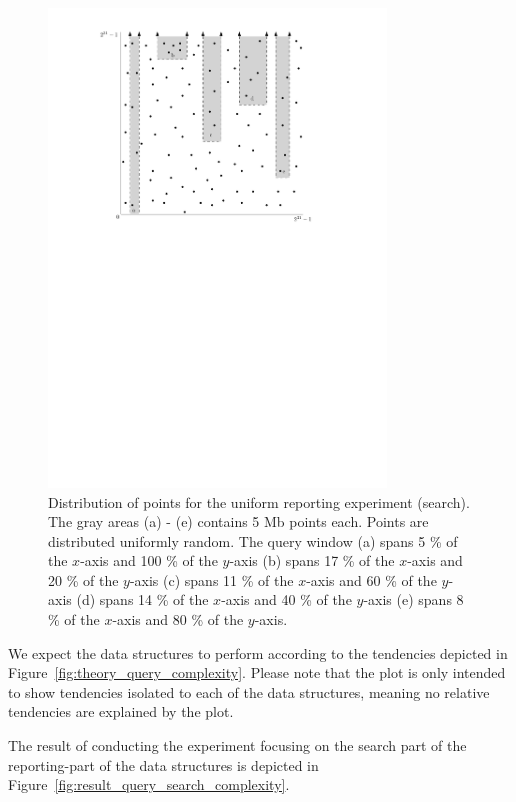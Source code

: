 \documentclass[twoside,11pt,openright]{report}
\begin{document}
\begin{figure}[h]
	\centering
	\includegraphics[width=0.8\textwidth]{../figures/query_uniform}
	\caption{Distribution of points for the uniform reporting experiment (search). The gray areas (a) - (e) contains 5 Mb points each. Points are distributed uniformly random. The query window (a) spans 5 \% of the $x$-axis and 100 \% of the $y$-axis (b) spans 17 \% of the $x$-axis and 20 \% of the $y$-axis (c) spans 11 \% of the $x$-axis and 60 \% of the $y$-axis (d) spans 14 \% of the $x$-axis and 40 \% of the $y$-axis (e) spans 8 \% of the $x$-axis and 80 \% of the $y$-axis.}
	\label{fig:experiment_query_uniform}
\end{figure}

We expect the data structures to perform according to the tendencies depicted in Figure~\ref{fig:theory_query_complexity}. Please note that the plot is only intended to show tendencies isolated to each of the data structures, meaning no relative tendencies are explained by the plot.

The result of conducting the experiment focusing on the search part of the reporting-part of the data structures is depicted in Figure~\ref{fig:result_query_search_complexity}.
\end{document}
